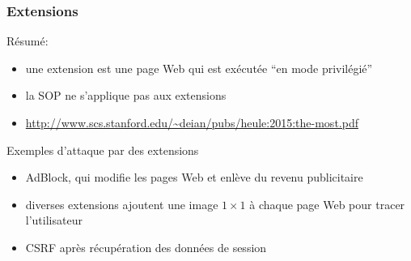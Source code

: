 \begin{reveals}
\begin{frame}
\end{frame}

\begin{frame}
  \frametitle{Extensions}

  \vfill

  \begin{block}{Résumé:}
    \begin{itemize}
    \item une extension est une page Web qui est exécutée ``en mode privilégié''
    \item la SOP ne s'applique pas aux extensions
    \item \url{http://www.scs.stanford.edu/~deian/pubs/heule:2015:the-most.pdf}
    \end{itemize}
  \end{block}

  \vfill

  \begin{block}{Exemples d'attaque par des extensions}
    \begin{itemize}
    \item AdBlock, qui modifie les pages Web et enlève du revenu publicitaire
    \item diverses extensions ajoutent une image \(1\times 1\) à
      chaque page Web pour tracer l'utilisateur
    \item CSRF après récupération des données de session
    \end{itemize}
  \end{block}

  \vfill


  \vfill

\end{frame}




\end{reveals}

 
